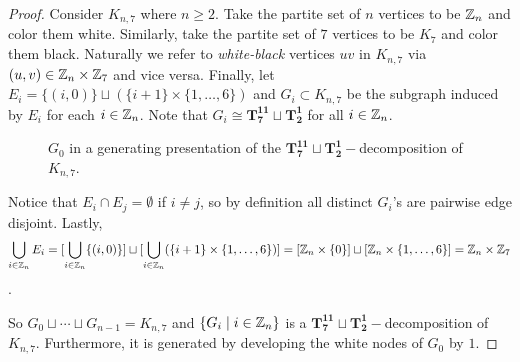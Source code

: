 \begin{proof}
    Consider $K_{n,7}$ where $n\geq 2$. Take the partite set of $n$ vertices to be $\mathbb{Z}_{n}$ and color them white. Similarly, take the partite set of $7$ vertices to be $K_{7}$ and color them black. Naturally we refer to \textit{white-black} vertices $uv$ in $K_{n,7}$ via $(u,v)\in \mathbb{Z}_{n}\times\mathbb{Z}_{7}$ and vice versa. Finally, let $E_{i}=\{(i,0)\}\sqcup (\{i+1\}\times \{1,\hdots,6\})$ and $G_{i}\subset K_{n,7}$ be the subgraph induced by $E_{i}$ for each $i\in \mathbb{Z}_{n}$. Note that $G_{i}\cong \mathbf{T_{7}^{11}}\sqcup\mathbf{T_{2}^{1}}$ for all $i\in \mathbb{Z}_{n}$.

    \begin{figure}[H]
        \centering
        
        \caption{$G_{0}$ in a generating presentation of the $\mathbf{T_{7}^{11}}\sqcup\mathbf{T_{2}^{1}}-$decomposition of $K_{n,7}$.}
        \label{fig:enter-label}
    \end{figure}

    \noindent Notice that $E_{i}\cap E_{j}=\emptyset$ if $i\neq j$, so by definition all distinct $G_{i}$'s are pairwise edge disjoint. Lastly,
    $$\bigcup_{i\in \mathbb{Z}_{n}} E_{i}=[\bigcup_{i\in \mathbb{Z}_{n}} \{(i,0)\}]\sqcup [\bigcup_{i\in \mathbb{Z}_{n}} (\{i+1\}\times \{1,\hdots, 6\})]=[\mathbb{Z}_{n}\times \{0\}]\sqcup [\mathbb{Z}_{n}\times \{1,\hdots, 6\}]=\mathbb{Z}_{n}\times \mathbb{Z}_{7}$$.
    
    \noindent So $G_{0}\sqcup \cdots \sqcup G_{n-1}=K_{n,7}$ and $\{G_{i}\mid i\in \mathbb{Z}_{n}\}$ is a $\mathbf{T_{7}^{11}}\sqcup\mathbf{T_{2}^{1}}-$decomposition of $K_{n,7}$. Furthermore, it is generated by developing the white nodes of $G_{0}$ by $1$.
\end{proof}




